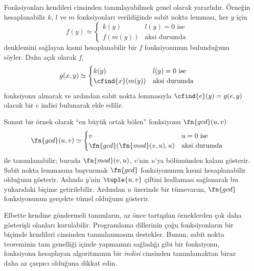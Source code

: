 


Fonksiyonları kendileri cinsinden tanımlayabilmek genel olarak yararlıdır.
Örneğin hesaplanabilir $k$, $l$ ve $m$ fonksiyonları verildiğinde sabit nokta
lemması, her $y$ için
\[
  f(y)\simeq\begin{cases}
    k(y) & \text{$l(y)=0$ ise}\\
    f(m(y)) & \text{aksi durumda}
  \end{cases}
\]
denklemini sağlayan kısmi hesaplanabilir bir $f$ fonksiyonunun bulunduğunu
söyler. Daha açık olarak $f$,
\[
  g(x,y)\simeq\begin{cases}
    k(y) & \text{$l(y)=0$ ise}\\
    \cfind{x}(m(y)) & \text{aksi durumda}
  \end{cases}
\]
fonksiyonu alınarak ve ardından sabit nokta lemmasıyla
$\cfind{e}(y)=g(e,y)$ olacak bir $e$ indisi bulunarak elde edilir.

Somut bir örnek olarak ``en büyük ortak bölen'' fonksiyonu
$\fn{gcd}(u,v)$
\[
  \fn{gcd}(u,v)\simeq\begin{cases}
    v & \text{$u=0$ ise}\\
    \fn{gcd}(\fn{mod}(v,u),u) & \text{aksi durumda}
  \end{cases}
\]
ile tanımlanabilir; burada $\fn{mod}(v,u)$, $v$'nin $u$'ya bölümünden kalanı
gösterir. Sabit nokta lemmasına başvurmak $\fn{gcd}$ fonksiyonunun kısmi
hesaplanabilir olduğunu gösterir. Aslında $y$'nin $\tuple{u,v}$ çiftini
kodlaması sağlanarak bu yukarıdaki biçime getirilebilir. Ardından $u$
üzerinde bir tümevarım, $\fn{gcd}$ fonksiyonunun gerçekte tümel olduğunu
gösterir.

Elbette kendine göndermeli tanımların, az önce tartışılan örneklerden çok daha
gösterişli olanları kurulabilir. Programlama dillerinin çoğu fonksiyonların
bir biçimde kendileri cinsinden tanımlanmasını destekler. Bunun, sabit nokta
teoreminin tam genelliği içinde yapmamızı sağladığı gibi bir fonksiyonu,
fonksiyonu hesaplayan algoritmanın bir \emph{indisi} cinsinden tanımlamaktan
biraz daha az çarpıcı olduğuna dikkat edin.

